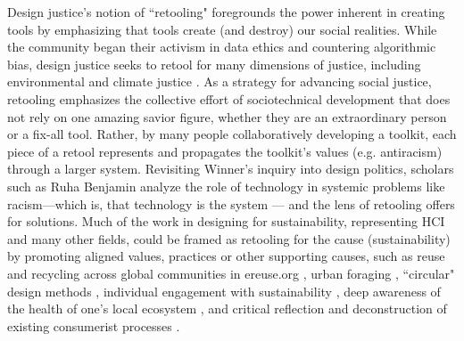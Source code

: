  Design justice's notion of ``retooling" foregrounds the power inherent in creating tools by emphasizing that tools create (and destroy) our social realities. While the community began their activism in data ethics and countering algorithmic bias, design justice seeks to retool for many dimensions of justice, including environmental and climate justice \cite{justice_institute_aboriginal_2023}. As a strategy for advancing social justice, retooling emphasizes the collective effort of sociotechnical development that does not rely on one amazing savior figure, whether they are an extraordinary person or a fix-all tool. Rather, by many people collaboratively developing a toolkit, each piece of a retool represents and propagates the toolkit's values (e.g. antiracism) through a larger system. Revisiting Winner's inquiry into design politics, scholars such as Ruha Benjamin analyze the role of technology in systemic problems like racism---which is, that technology is the system \cite{benjamin_race_2019} --- and the lens of retooling offers  for solutions. Much of the work in designing for sustainability, representing HCI and many other fields, could be framed as retooling for the cause (sustainability) by promoting aligned values, practices or other supporting causes, such as reuse and recycling across global communities in ereuse.org \cite{franquesa_circular_2016}, urban foraging \cite{disalvo_fruit_2017}, ``circular" design methods \cite{10.1145/3393914.3395894}, individual engagement with sustainability \cite{disalvo_mapping_2010,dourish_hci_2010}, deep awareness of the health of one's local ecosystem \cite{aoki_vehicle_2009,kim_wearair:_2010,lapina_ozone_2014,yunan_evolutionary_2021}, and critical reflection and deconstruction of existing consumerist processes \cite{blevis_sustainable_2007,nardi_computing_2018,pan_fashion_2014,raghavan_means_2017}.

